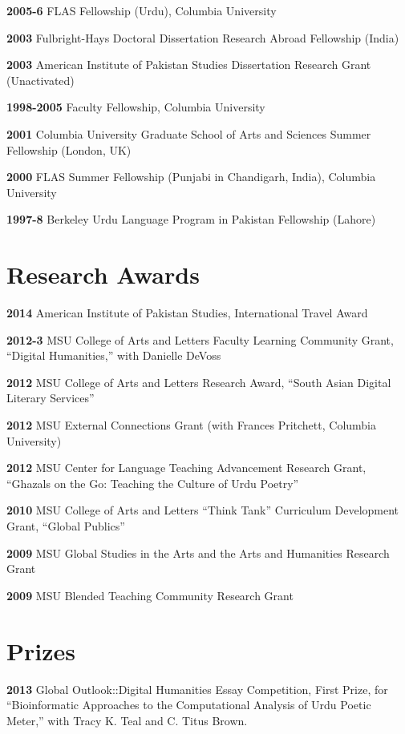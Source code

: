 \documentclass[letterpaper,12pt]{article}
\begin{document}
\textbf{2005-6}
FLAS Fellowship (Urdu), Columbia University

\textbf{2003}
Fulbright-Hays Doctoral Dissertation Research Abroad Fellowship (India)

\textbf{2003}
American Institute of Pakistan Studies Dissertation Research Grant (Unactivated)

\textbf{1998-2005}
Faculty Fellowship, Columbia University

\textbf{2001}
Columbia University Graduate School of Arts and Sciences Summer Fellowship (London, UK)

\textbf{2000}
FLAS Summer Fellowship (Punjabi in Chandigarh, India), Columbia University

\textbf{1997-8}
Berkeley Urdu Language Program in Pakistan Fellowship (Lahore)


\section{Research Awards%
  \label{research-awards}%
}

\textbf{2014}
American Institute of Pakistan Studies, International Travel Award

\textbf{2012-3}
MSU College of Arts and Letters Faculty Learning Community Grant,
“Digital Humanities,” with Danielle DeVoss

\textbf{2012}
MSU College of Arts and Letters Research Award,
“South Asian Digital Literary Services”

\textbf{2012}
MSU External Connections Grant (with Frances Pritchett, Columbia University)

\textbf{2012}
MSU Center for Language Teaching Advancement Research Grant,
“Ghazals on the Go: Teaching the Culture of Urdu Poetry”

\textbf{2010}
MSU College of Arts and Letters “Think Tank” Curriculum Development Grant,
“Global Publics”

\textbf{2009} MSU Global Studies in the Arts and the Arts and Humanities Research Grant

\textbf{2009} MSU Blended Teaching Community Research Grant


\section{Prizes%
  \label{prizes}%
}

\textbf{2013}
Global Outlook::Digital Humanities Essay Competition,
First Prize,
for “Bioinformatic Approaches to the Computational Analysis of Urdu Poetic Meter,”
with Tracy K. Teal and C. Titus Brown.
\end{document}
